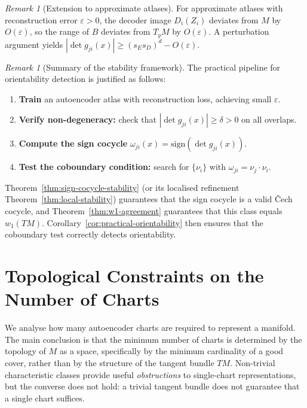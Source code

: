 \documentclass[11pt]{article}
\newcommand{\sign}{\mathrm{sign}}
\theoremstyle{plain}
\theoremstyle{definition}
\theoremstyle{remark}
\newtheorem{remark}[theorem]{Remark}
\begin{document}
\begin{remark}[Extension to approximate atlases]
For approximate atlases with reconstruction error $\varepsilon > 0$, the decoder image $D_i(Z_i)$ deviates from $M$ by $O(\varepsilon)$, so the range of $B$ deviates from $T_yM$ by $O(\varepsilon)$. A perturbation argument yields $|\det g_{ji}(x)| \geq (s_E s_D)^d - O(\varepsilon)$.
\end{remark}

\begin{remark}[Summary of the stability framework]
The practical pipeline for orientability detection is justified as follows:
\begin{enumerate}
    \item \textbf{Train} an autoencoder atlas with reconstruction loss, achieving small $\varepsilon$.
    \item \textbf{Verify non-degeneracy:} check that $|\det g_{ji}(x)| \geq \delta > 0$ on all overlaps.
    \item \textbf{Compute the sign cocycle} $\omega_{ji}(x) = \sign(\det g_{ji}(x))$.
    \item \textbf{Test the coboundary condition:} search for $\{\nu_i\}$ with $\omega_{ji} = \nu_j \cdot \nu_i$.
\end{enumerate}
Theorem~\ref{thm:sign-cocycle-stability} (or its localised refinement Theorem~\ref{thm:local-stability}) guarantees that the sign cocycle is a valid \v{C}ech cocycle, and Theorem~\ref{thm:w1-agreement} guarantees that this class equals $w_1(TM)$. Corollary~\ref{cor:practical-orientability} then ensures that the coboundary test correctly detects orientability.
\end{remark}

\section{Topological Constraints on the Number of Charts}\label{sec:obstruction}

We analyse how many autoencoder charts are required to represent a manifold. The main conclusion is that the minimum number of charts is determined by the topology of $M$ as a space, specifically by the minimum cardinality of a good cover, rather than by the structure of the tangent bundle $TM$. Non-trivial characteristic classes provide useful \emph{obstructions} to single-chart representations, but the converse does not hold: a trivial tangent bundle does not guarantee that a single chart suffices.
\end{document}
